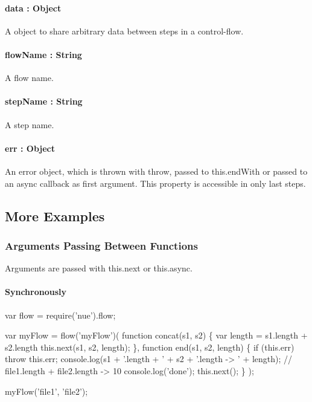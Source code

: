 \paragraph*{data \+: Object}

A object to share arbitrary data between steps in a control-\/flow.

\paragraph*{flow\+Name \+: String}

A flow name.

\paragraph*{step\+Name \+: String}

A step name.

\paragraph*{err \+: Object}

An error object, which is thrown with {\ttfamily throw}, passed to {\ttfamily this.\+end\+With} or passed to an async callback as first argument. This property is accessible in only last steps.

\subsection*{More Examples}

\subsubsection*{Arguments Passing Between Functions}

Arguments are passed with {\ttfamily this.\+next} or {\ttfamily this.\+async}.

\paragraph*{Synchronously}


\begin{DoxyCode}
var flow = require(\textcolor{stringliteral}{'nue'}).flow;

var myFlow = flow(\textcolor{stringliteral}{'myFlow'})(
  \textcolor{keyword}{function} concat(s1, s2) \{
    var length = s1.length + s2.length
    this.next(s1, s2, length);
  \},
  \textcolor{keyword}{function} end(s1, s2, length) \{
    \textcolor{keywordflow}{if} (this.err) \textcolor{keywordflow}{throw} this.err;
    console.log(s1 + \textcolor{stringliteral}{'.length + '} + s2 + \textcolor{stringliteral}{'.length -> '} + length); \textcolor{comment}{// file1.length + file2.length -> 10}
    console.log(\textcolor{stringliteral}{'done'});
    this.next();
  \}
);

myFlow(\textcolor{stringliteral}{'file1'}, \textcolor{stringliteral}{'file2'});
\end{DoxyCode}


